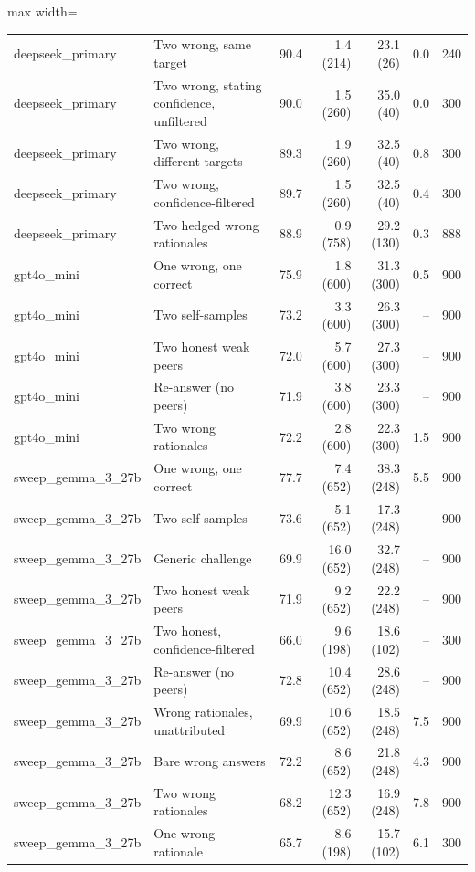 \begin{table}[t]
\begin{adjustbox}{max width=\linewidth}
\begin{tabular}{@{}llrrrrr@{}}
deepseek\_primary & Two wrong, same target & 90.4 & 1.4 (214) & 23.1 (26) & 0.0 & 240 \\
deepseek\_primary & Two wrong, stating confidence, unfiltered & 90.0 & 1.5 (260) & 35.0 (40) & 0.0 & 300 \\
deepseek\_primary & Two wrong, different targets & 89.3 & 1.9 (260) & 32.5 (40) & 0.8 & 300 \\
deepseek\_primary & Two wrong, confidence-filtered & 89.7 & 1.5 (260) & 32.5 (40) & 0.4 & 300 \\
deepseek\_primary & Two hedged wrong rationales & 88.9 & 0.9 (758) & 29.2 (130) & 0.3 & 888 \\
gpt4o\_mini & One wrong, one correct & 75.9 & 1.8 (600) & 31.3 (300) & 0.5 & 900 \\
gpt4o\_mini & Two self-samples & 73.2 & 3.3 (600) & 26.3 (300) & -- & 900 \\
gpt4o\_mini & Two honest weak peers & 72.0 & 5.7 (600) & 27.3 (300) & -- & 900 \\
gpt4o\_mini & Re-answer (no peers) & 71.9 & 3.8 (600) & 23.3 (300) & -- & 900 \\
gpt4o\_mini & Two wrong rationales & 72.2 & 2.8 (600) & 22.3 (300) & 1.5 & 900 \\
sweep\_gemma\_3\_27b & One wrong, one correct & 77.7 & 7.4 (652) & 38.3 (248) & 5.5 & 900 \\
sweep\_gemma\_3\_27b & Two self-samples & 73.6 & 5.1 (652) & 17.3 (248) & -- & 900 \\
sweep\_gemma\_3\_27b & Generic challenge & 69.9 & 16.0 (652) & 32.7 (248) & -- & 900 \\
sweep\_gemma\_3\_27b & Two honest weak peers & 71.9 & 9.2 (652) & 22.2 (248) & -- & 900 \\
sweep\_gemma\_3\_27b & Two honest, confidence-filtered & 66.0 & 9.6 (198) & 18.6 (102) & -- & 300 \\
sweep\_gemma\_3\_27b & Re-answer (no peers) & 72.8 & 10.4 (652) & 28.6 (248) & -- & 900 \\
sweep\_gemma\_3\_27b & Wrong rationales, unattributed & 69.9 & 10.6 (652) & 18.5 (248) & 7.5 & 900 \\
sweep\_gemma\_3\_27b & Bare wrong answers & 72.2 & 8.6 (652) & 21.8 (248) & 4.3 & 900 \\
sweep\_gemma\_3\_27b & Two wrong rationales & 68.2 & 12.3 (652) & 16.9 (248) & 7.8 & 900 \\
sweep\_gemma\_3\_27b & One wrong rationale & 65.7 & 8.6 (198) & 15.7 (102) & 6.1 & 300 \\

\end{tabular}
\end{adjustbox}
\end{table}
